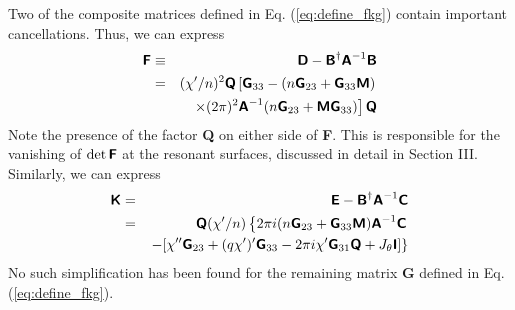 \documentclass[prb,twocolumn,showpacs,preprintnumbers,amsmath,amssymb]{revtex4}
\renewcommand*{\t}[1]{\hbox{\sffamily\bfseries #1}}
\begin{document}
Two of the composite matrices defined in Eq. (\ref{eq:define_fkg})
contain important cancellations.  Thus, we can express
\begin{eqnarray}
\t{F} \equiv&& \t{D} - \t{B}^\dagger \t{A}^{-1} \t{B} \nonumber \\
=&& (\chi' / n)^2 \t{Q} \left[ \t{G}_{33} 
	- (n \t{G}_{23} + \t{G}_{33} \t{M})  \right. \nonumber \\
&&\left. \times
	(2 \pi)^2 \t{A}^{-1}
	(n \t{G}_{23} +  \t{M} \t{G}_{33}) \right] \t{Q}
\label{eq:simplify_f}
\end{eqnarray}
Note the presence of the factor \t{Q} on either side of \t{F}.  This is
responsible for the vanishing of $\det \t{F}$ at the resonant surfaces,
discussed in detail in Section III.  Similarly, we can express
\begin{eqnarray}
\t{K} =&& \t{E} - \t{B}^\dagger \t{A}^{-1} \t{C} \nonumber \\
	=&& \t{Q} (\chi'/n) \left\{ 2 \pi i 
	(n \t{G}_{23} + \t{G}_{33} \t{M}) \t{A}^{-1} \t{C} 
	\right. \nonumber \\
&&\left. - [ \chi'' \t{G}_{23} + (q \chi')' \t{G}_{33}
	- 2 \pi i \chi' \t{G}_{31} \t{Q} + J_\theta \t{I}]
	\right\} \nonumber \\
\label{eq:simplify_k}
\end{eqnarray}
No such simplification has been found for the remaining matrix \t{G}
defined in Eq. (\ref{eq:define_fkg}).


\end{document}
